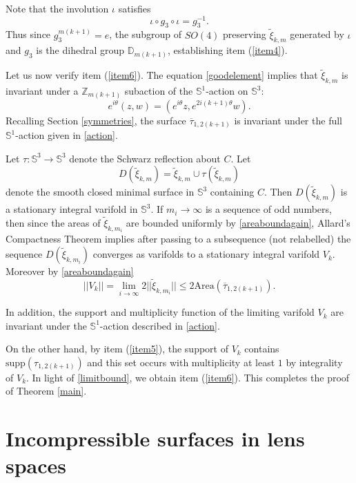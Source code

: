 \documentclass[11pt, reqno]{amsart}
\numberwithin{equation}{section}
\begin{document}
Note that the involution $\iota$ satisfies \begin{equation}\iota \circ g_3\circ  \iota=g^{-1}_3.\end{equation}  Thus since $g_3^{m(k+1)}=e$, the subgroup of $SO(4)$ preserving $\tilde{\xi}_{k,m}$ generated by $\iota$ and $g_3$ is the dihedral group $\mathbb{D}_{m(k+1)}$, establishing item (\ref{item4}).

Let us now verify item (\ref{item6}).  The equation \eqref{goodelement} implies that $\tilde{\xi}_{k,m}$ is invariant under a $\mathbb{Z}_{m(k+1)}$ subaction of the $\mathbb{S}^1$-action on $\mathbb{S}^3$:
\begin{equation}\label{action}
e^{i\theta}(z,w) = ( e^{i\theta}z, e^{2i(k+1)\theta}w).
\end{equation}
Recalling Section \ref{symmetries}, the surface $\overline{\tau}_{1,2(k+1)}$ is invariant under the full $\mathbb{S}^1$-action given in \eqref{action}.


Let $\tau:\mathbb{S}^3\to\mathbb{S}^3$ denote the Schwarz reflection about $C$. Let \begin{equation}D(\tilde{\xi}_{k,m})=\tilde{\xi}_{k,m}\cup\tau(\tilde{\xi}_{k,m})\end{equation} denote the smooth closed minimal surface in $\mathbb{S}^3$ containing $C$.  Then $D(\tilde{\xi}_{k,m})$ is a stationary integral varifold in $\mathbb{S}^3$.  If $m_i\to\infty$ is a sequence of odd numbers, then since the areas of $\tilde{\xi}_{k,m_i}$ are bounded uniformly by \eqref{areaboundagain}, Allard's Compactness Theorem implies after passing to a subsequence (not relabelled) the sequence $D(\tilde{\xi}_{k,m_i})$ converges as varifolds to a stationary integral varifold $V_k$. Moreover by \eqref{areaboundagain}
\begin{equation}\label{limitbound}
||V_k||=\lim_{i\to\infty}2||\tilde{\xi}_{k,m_i}||\leq 2\mbox{Area}(\overline{\tau}_{1,2(k+1)}).
\end{equation}

In addition, the support and multiplicity function of the limiting varifold $V_k$ are invariant under the $\mathbb{S}^1$-action described in \eqref{action}.

On the other hand, by item (\ref{item5}), the support of $V_k$ contains 
$\mbox{supp}(\tau_{1,2(k+1)})$ and this set occurs with multiplicity at least $1$ by integrality of $V_k$.  In light of \eqref{limitbound}, we obtain item  (\ref{item6}).  This completes the proof of Theorem \ref{main}.  


\section{Incompressible surfaces in lens spaces}\label{lenssection}
\end{document}
